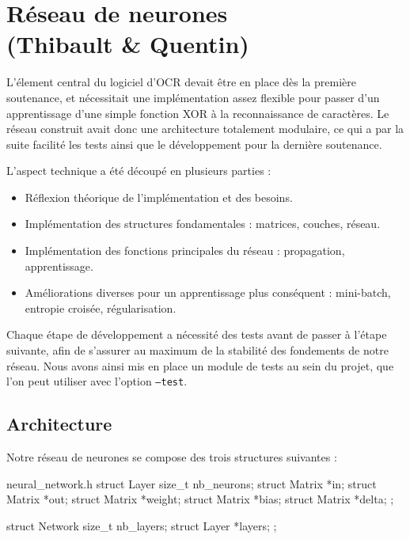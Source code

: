 \chapter{Réseau de neurones \\(Thibault \& Quentin)}

L'élement central du logiciel d'OCR devait être en place dès la première
soutenance, et nécessitait une implémentation assez flexible pour passer d'un
apprentissage d'une simple fonction XOR à la reconnaissance de caractères. Le
réseau construit avait donc une architecture totalement modulaire, ce qui a par
la suite facilité les tests ainsi que le développement pour la dernière
soutenance.

L'aspect technique a été découpé en plusieurs parties :

\begin{itemize}
    \item Réflexion théorique de l'implémentation et des besoins.
    \item Implémentation des structures fondamentales : matrices, couches,
        réseau.
    \item Implémentation des fonctions principales du réseau : propagation,
        apprentissage.
    \item Améliorations diverses pour un apprentissage plus conséquent :
        mini-batch, entropie croisée, régularisation.
\end{itemize}

Chaque étape de développement a nécessité des tests avant de passer à l'étape
suivante, afin de s'assurer au maximum de la stabilité des fondements de notre
réseau. Nous avons ainsi mis en place un module de tests au sein du projet, que
l'on peut utiliser avec l'option \texttt{--test}.

\section{Architecture}

Notre réseau de neurones se compose des trois structures suivantes :

\begin{myminted}{neural\_network.h}
struct Layer
{
    size_t nb_neurons;
    struct Matrix *in;
    struct Matrix *out;
    struct Matrix *weight;
    struct Matrix *bias;
    struct Matrix *delta;
};

struct Network
{
    size_t nb_layers;
    struct Layer *layers;
};
\end{myminted}

